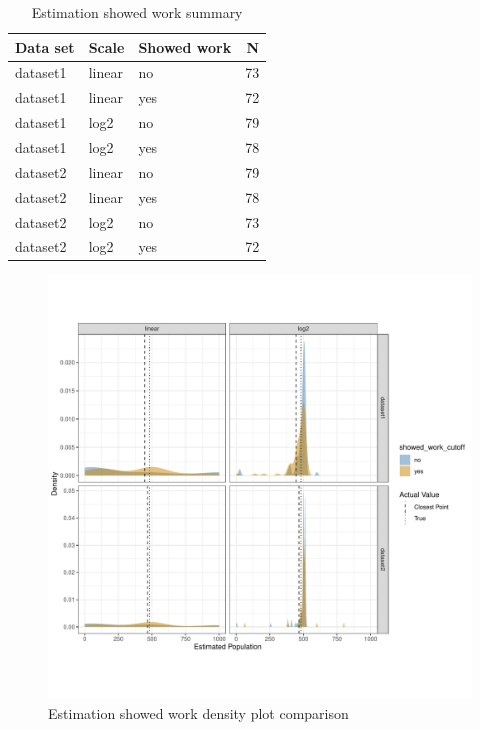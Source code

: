 \documentclass[print]{nuthesis}
\begin{document}
\begin{table}

\caption{\label{tab:unnamed-chunk-2}Estimation showed work summary}
\centering
\begin{tabular}[t]{lllr}
\toprule
Data set & Scale & Showed work & N\\
\midrule
dataset1 & linear & no & 73\\
dataset1 & linear & yes & 72\\
dataset1 & log2 & no & 79\\
dataset1 & log2 & yes & 78\\
dataset2 & linear & no & 79\\
\addlinespace
dataset2 & linear & yes & 78\\
dataset2 & log2 & no & 73\\
dataset2 & log2 & yes & 72\\
\bottomrule
\end{tabular}
\end{table}

\begin{figure}[tbp]

{\centering \includegraphics[width=1\linewidth,]{thesis_files/figure-latex/unnamed-chunk-2-1} 

}

\caption{Estimation showed work density plot comparison}\label{fig:unnamed-chunk-2}
\end{figure}
\end{document}
